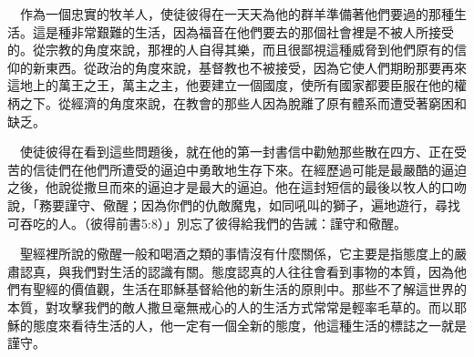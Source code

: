 \documentclass{book}
\begin{document}
\begin{center}
\noindent{}
\end{center}

　作為一個忠實的牧羊人，使徒彼得在一天天為他的群羊準備著他們要過的那種生活。這是種非常艱難的生活，因為福音在他們要去的那個社會裡是不被人所接受的。從宗教的角度來說，那裡的人自得其樂，而且很鄙視這種威脅到他們原有的信仰的新東西。從政治的角度來說，基督教也不被接受，因為它使人們期盼那要再來這地上的萬王之王，萬主之主，他要建立一個國度，使所有國家都要臣服在他的權柄之下。從經濟的角度來說，在教會的那些人因為脫離了原有體系而遭受著窮困和缺乏。

　使徒彼得在看到這些問題後，就在他的第一封書信中勸勉那些散在四方、正在受苦的信徒們在他們所遭受的逼迫中勇敢地生存下來。在經歷過可能是最嚴酷的逼迫之後，他說從撒旦而來的逼迫才是最大的逼迫。他在這封短信的最後以牧人的口吻說，「務要謹守、儆醒；因為你們的仇敵魔鬼，如同吼叫的獅子，遍地遊行，尋找可吞吃的人。（彼得前書5:8）」別忘了彼得給我們的告誡：謹守和儆醒。

　聖經裡所說的儆醒一般和喝酒之類的事情沒有什麼關係，它主要是指態度上的嚴肅認真，與我們對生活的認識有關。態度認真的人往往會看到事物的本質，因為他們有聖經的價值觀，生活在耶穌基督給他的新生活的原則中。那些不了解這世界的本質，對攻擊我們的敵人撒旦毫無戒心的人的生活方式常常是輕率毛草的。而以耶穌的態度來看待生活的人，他一定有一個全新的態度，他這種生活的標誌之一就是謹守。
\end{document}
